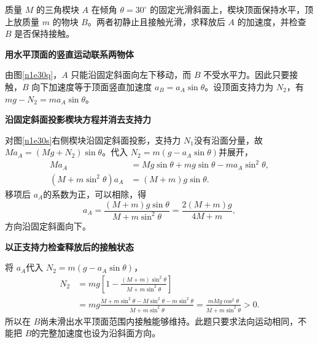\begin{question}\begin{example}[固定斜面上的水平顶面楔块]\label{n1e30}
质量 $M$ 的三角楔块 $A$ 在倾角 $\theta=30^\circ$ 的固定光滑斜面上，楔块顶面保持水平，顶上放质量 $m$ 的物块 $B$。两者初静止且接触光滑，求释放后 $A$ 的加速度，并检查 $B$ 是否保持接触。
\end{example}\end{question}
\begin{solution}\textbf{用水平顶面的竖直运动联系两物体}\par\nobreak
由图\ref{n1e30q}，$A$ 只能沿固定斜面向左下移动，而 $B$ 不受水平力。因此只要接触，$B$ 向下加速度等于顶面竖直加速度 $a_B=a_A\sin\theta$。设顶面支持力为 $N_2$，有 $mg-N_2=ma_A\sin\theta$。


\par\medskip{}\noindent\textbf{沿固定斜面投影楔块方程并消去支持力}\par\nobreak
对图\ref{n1e30s}右侧楔块沿固定斜面投影，支持力 $N_1$没有沿面分量，故 $Ma_A=(Mg+N_2)\sin\theta$。代入 $N_2=m(g-a_A\sin\theta)$并展开，
\begin{align*}
 Ma_A&=Mg\sin\theta+mg\sin\theta-ma_A\sin^2\theta,\\
 (M+m\sin^2\theta)a_A&=(M+m)g\sin\theta.
\end{align*}
移项后 $a_A$的系数为正，可以相除，得
\[
 a_A=\frac{(M+m)g\sin\theta}{M+m\sin^2\theta}
 =\frac{2(M+m)g}{4M+m},
\]
方向沿固定斜面向下。

\par\medskip{}\noindent\textbf{以正支持力检查释放后的接触状态}\par\nobreak
将 $a_A$代入 $N_2=m(g-a_A\sin\theta)$，
\begin{align*}
 N_2&=mg\left[1-\frac{(M+m)\sin^2\theta}{M+m\sin^2\theta}\right]\\
 &=mg\frac{M+m\sin^2\theta-M\sin^2\theta-m\sin^2\theta}
 {M+m\sin^2\theta}
 =\frac{mMg\cos^2\theta}{M+m\sin^2\theta}>0.
\end{align*}
所以在 $B$尚未滑出水平顶面范围内接触能够维持。此题只要求法向运动相同，不能把 $B$的完整加速度也设为沿斜面方向。
\end{solution}
